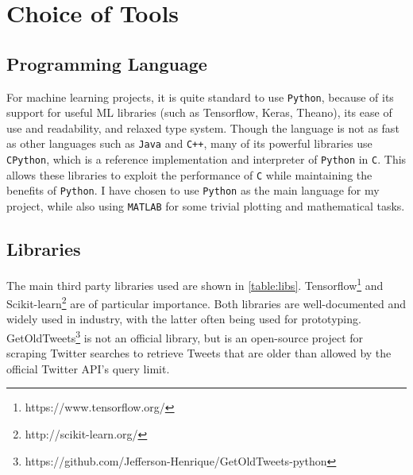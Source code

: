 \documentclass[12pt,a4paper,twoside,openright]{report}
\begin{document}
\section{Choice of Tools}
\label{sec:introTool}

\subsection{Programming Language}

For machine learning projects, it is quite standard to use \texttt{Python},
because of its support for useful ML libraries (such as Tensorflow, Keras, Theano), its
ease of use and readability, and relaxed type system. Though the language is not as
fast as other languages such as \texttt{Java} and \texttt{C++}, many of its
powerful libraries use \texttt{CPython}, which is a reference implementation
and interpreter of \texttt{Python} in \texttt{C}.
This allows these libraries to exploit the performance of \texttt{C} while maintaining
the benefits of \texttt{Python}. I have chosen to use \texttt{Python} as the main
language for my project, while also using \texttt{MATLAB} for some trivial
plotting and mathematical tasks.

\subsection{Libraries}
\label{sec:introLib}

The main third party libraries used are shown in \cref{table:libs}. Tensorflow\footnote{https://www.tensorflow.org/}
and Scikit-learn\footnote{http://scikit-learn.org/} are
of particular importance. Both libraries are well-documented and widely used in industry, with the 
latter often being used for prototyping. GetOldTweets\footnote{https://github.com/Jefferson-Henrique/GetOldTweets-python}
is not an official library, but is an open-source
project for scraping Twitter searches to retrieve Tweets that are older than allowed by the official Twitter 
API's query limit.
\end{document}
